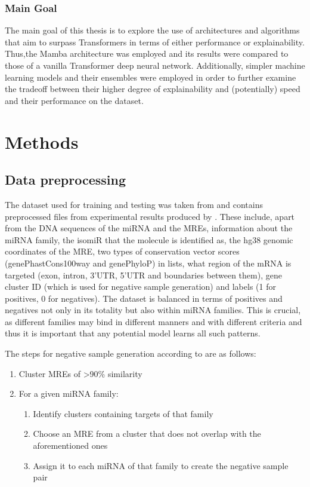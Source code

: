 \documentclass[en,ack]{dimscthesis}
\begin{document}
\subsection{Main Goal}
\par The main goal of this thesis is to explore the use of architectures and algorithms that aim to surpass Transformers in terms of either performance or explainability. Thus,the Mamba architecture was employed and its results were compared to those of a vanilla Transformer deep neural network. Additionally, simpler machine learning models and their ensembles were employed in order to further examine the tradeoff between their higher degree of explainability and (potentially) speed and their performance on the \cite{manakovScalableDeepProfiling2022} dataset.

\chapter{Methods}
\label{Methods}
\section{Data preprocessing}
\par The dataset used for training and testing was taken from \cite{sammutMiRBenchNovelBenchmark2025} and contains preprocessed files from experimental results produced by \cite{manakovScalableDeepProfiling2022,hejretAnalysisChimericReads2023}. These include, apart from the DNA sequences of the miRNA and the MREs, information about the miRNA family, the isomiR that the molecule is identified as, the hg38 genomic coordinates of the MRE, two types of conservation vector scores (genePhastCons100way and genePhyloP) in lists, what region of the mRNA is targeted (exon, intron, 3'UTR, 5'UTR and boundaries between them), gene cluster ID (which is used for negative sample generation) and labels (1 for positives, 0 for negatives). The dataset is balanced in terms of positives and negatives not only in its totality but also within miRNA families. This is crucial, as different families may bind in different manners and with different criteria and thus it is important that any potential model learns all such patterns.

The steps for negative sample generation according to \cite{sammutMiRBenchNovelBenchmark2025} are as follows:
\begin{enumerate}
	\item Cluster MREs of >90\% similarity
	\item For a given miRNA family:
	\begin{enumerate}
		\item Identify clusters containing targets of that family 
		\item Choose an MRE from a cluster that does not overlap with the aforementioned ones
		\item Assign it to each miRNA of that family to create the negative sample pair
	\end{enumerate}
\end{enumerate}
\end{document}

